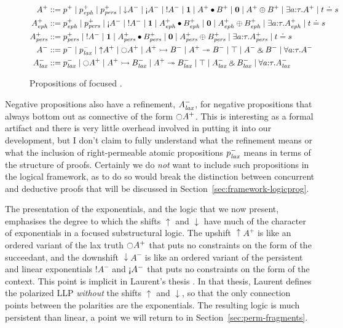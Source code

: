 \begin{figure}
\begin{align*}
A^+ & ::= p^+ \mid p^+_\meph \mid p^+_\mpers
        \mid {\downarrow}A^- \mid {\gnab}A^- \mid {!}A^- 
        \mid \one \mid A^+ \fuse B^+ \mid \zero \mid A^+ \oplus B^+ 
        \mid \exists a{:}\tau. A^+ \mid t \doteq s
\\
A^+_\meph & ::= p^+_\meph \mid p^+_\mpers
        \mid {\gnab}A^- \mid {!}A^- 
        \mid \one \mid A^+_\meph \fuse B^+_\meph
        \mid \zero \mid A^+_\meph \oplus B^+_\meph
        \mid \exists a{:}\tau. A^+_\meph \mid t \doteq s
\\
A^+_\mpers & ::= p^+_\mpers 
        \mid {!}A^- 
        \mid \one \mid A^+_\mpers \fuse B^+_\mpers 
        \mid \zero \mid A^+_\mpers \oplus B^+_\mpers
        \mid \exists a{:}\tau. A^+_\mpers \mid t \doteq s
\\
A^- & ::= p^- \mid p^-_\mlax 
        \mid {\uparrow}A^+ \mid {\ocircle}A^+
        \mid A^+ \lefti B^- \mid A^+ \righti B^-
        \mid \top \mid A^- \with B^-
        \mid \forall a{:}\tau.A^-
\\
A^-_\mlax & ::= p^-_\mlax 
        \mid {\ocircle}A^+
        \mid A^+ \lefti B^-_\mlax \mid A^+ \righti B^-_\mlax
        \mid \top \mid A^-_\mlax \with B^-_\mlax
        \mid \forall a{:}\tau.A^-_\mlax
\end{align*}
\caption{Propositions of focused \ollll.}
\label{fig:ordered}
\end{figure}

Negative propositions also have a refinement, $A^-_{\it lax}$, for
negative propositions that always bottom out as connective 
of the form
${\ocircle}A^+$.  This is interesting as a formal artifact and there
is very little overhead involved in putting it into our development,
but I don't claim to fully understand what the refinement means or
what the inclusion of right-permeable atomic propositions $p^-_{\it lax}$
means in terms of the structure of proofs. Certainly we do {\it not}
want to include such propositions in the logical framework, as to do
so would break the distinction between concurrent and deductive proofs
that will be discussed in Section~\ref{sec:framework-logicprog}.

The presentation of the exponentials, and the logic that we now
present, emphasises the degree to which the shifts ${\uparrow}$ and
${\downarrow}$ have much of the character of exponentials in a focused
substructural logic. The upshift ${\uparrow}A^+$ is like an ordered
variant of the lax truth ${\ocircle}A^+$ that puts no constraints on
the form of the succeedant, and the downshift ${\downarrow}A^-$ is
like an ordered variant of the persistent and linear exponentials
${!}A^-$ and ${\gnab}A^-$ that puts no constraints on the form of the
context. This point is implicit in Laurent's thesis
\cite{laurent02etude}. In that thesis, Laurent defines the polarized
LLP {\it without} the shifts ${\uparrow}$ and ${\downarrow}$, so that
the only connection points between the polarities are the
exponentials. The resulting logic is much persistent than linear,
a point we will return to in Section~\ref{sec:perm-fragments}.

